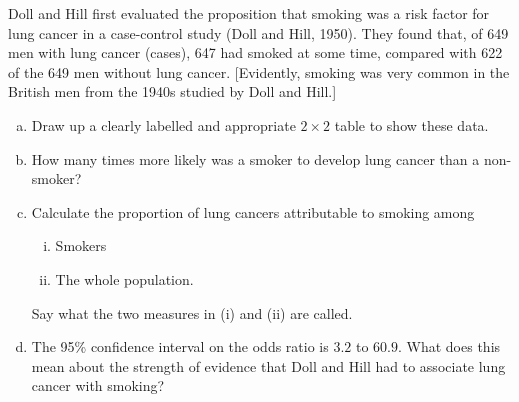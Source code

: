 
Doll and Hill first evaluated the proposition that smoking was a risk
factor for lung cancer in a case-control study (Doll and Hill, 1950).
They found that, of 649 men with lung cancer (cases), 647 had smoked
at some time, compared with 622 of the 649 men without lung cancer.
[Evidently, smoking was very common in the British men from the 1940s
studied by Doll and Hill.]
\begin{enumerate}[(a)]
\item Draw up a clearly labelled and appropriate $2\times 2$ table to
  show these data.
\answerSpace{1.2in}
\item How many times more likely was a smoker to develop lung cancer
  than a non-smoker?
\answerSpace{.6in}
\item Calculate the proportion of lung cancers attributable to smoking
  among
\begin{enumerate}[(i)]
\item Smokers
\answerSpace{.6in}
\item The whole population.
\answerSpace{.6in}
\end{enumerate}
Say what the two measures in (i) and (ii) are called.
\answerSpace{.6in}

\item The 95\% confidence interval on the odds ratio is $3.2$ to
  $60.9$.  What does this mean about the strength of evidence that
  Doll and Hill had to associate lung cancer with smoking?
\answerSpace{.6in}

\end{enumerate}

